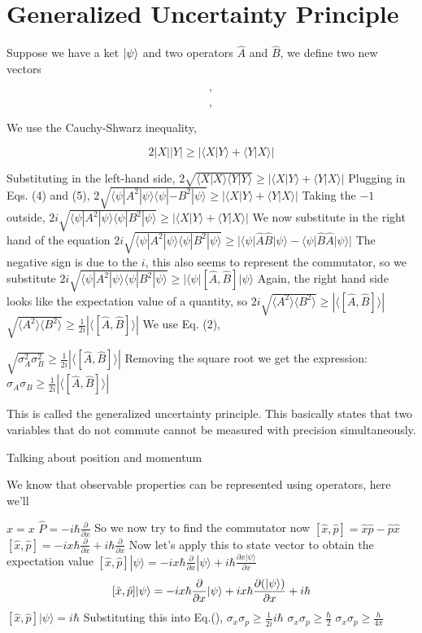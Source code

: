 \section{Generalized Uncertainty Principle}
Suppose we have a ket $\ket{\psi}$ and two operators $\hat{A}$ and $\hat{B}$, we define two new vectors

$$,$$

$$,$$

We use the Cauchy-Shwarz inequality,

$$ 2|X||Y| \geq |\langle X|Y \rangle + \langle Y|X \rangle |$$

Substituting in the left-hand side,
$2\sqrt{\langle X|X\rangle\langle Y|Y\rangle} \geq |\langle X| Y  \rangle+ \langle Y | X \rangle|$
Plugging in Eqs. (4) and (5),
$2\sqrt{\langle \psi |A^{2} |\psi \rangle \langle \psi | -B^{2}| \psi \rangle} \geq |\langle X | Y \rangle + \langle Y | X \rangle |$
Taking the $-1$ outside,
$2i\sqrt{\langle \psi |A^{2} |\psi \rangle \langle \psi | B^{2}| \psi \rangle} \geq |\langle X | Y \rangle + \langle Y | X \rangle|$
We now substitute in the right hand of the equation
$2i\sqrt{\langle \psi |A^{2} |\psi \rangle \langle \psi | B^{2}| \psi \rangle} \geq | \langle {\psi} |\hat{A}\hat{B}| {\psi} \rangle - \langle {\psi} |\hat{B}\hat{A}| {\psi} \rangle|$
The negative sign is due to the $i$, this also seems to represent the commutator, so we substitute
$2i\sqrt{\langle \psi |A^{2} |\psi \rangle \langle \psi | B^{2}| \psi \rangle }\geq |\langle\psi |[\hat{A},\hat{B}]|\psi\rangle$
Again, the right hand side looks like the expectation value of a quantity, so
$2i\sqrt{\langle A^{2} \rangle \langle B^{2} \rangle} \geq |\langle [\hat{A},\hat{B}] \rangle |$
$\sqrt{\langle A^{2} \rangle \langle B^{2} \rangle} \geq \frac{1}{2i} |\langle [\hat{A},\hat{B}] \rangle |$
We use Eq. (2),

$\sqrt{\sigma_{A}^{2}\sigma_{B}^{2}} \geq \frac{1}{2i} |\langle [\hat{A},\hat{B}] \rangle|$
Removing the square root we get the expression:
$\sigma_{A}\sigma_{B} \geq \frac{1}{2i} |\langle[\hat{A}, \hat{B}]\rangle|$

This is called the generalized uncertainty principle. This basically states that two variables that do not commute cannot be measured with precision simultaneously.

Talking about position and momentum

We know that observable properties can be represented using operators, here we'll 

$\hat{x} = x$
$\hat{P} = -i\hbar \frac{\partial}{\partial x}$
So we now try to find the commutator now
$[\hat{x}, \hat{p}] = \hat{x}\hat{p} - \hat{p}\hat{x}$
$[\hat{x}, \hat{p}] = -ix\hbar \frac{\partial}{\partial x} + i\hbar \frac{\partial}{\partial x}$
Now let's apply this to state vector to obtain the expectation value
$[\hat{x}, \hat{p}] |\psi\rangle = -ix\hbar \frac{\partial}{\partial x} |\psi\rangle + i\hbar \frac{\partial x|\psi\rangle}{\partial x}$
$$[\hat{x}, \hat{p}] |\psi\rangle = -ix\hbar \frac{\partial}{\partial x} |\psi\rangle + ix\hbar \pdv{(|\psi\rangle)}{x} + i\hbar$$
$[\hat{x}, \hat{p}] |\psi\rangle = i\hbar$
Substituting this into Eq.(),
$\sigma_{x}\sigma_{p} \geq \frac{1}{2i} i\hbar$
$\sigma_{x}\sigma_{p} \geq \frac{\hbar}{2}$ 
$\sigma_{x}\sigma_{p} \geq \frac{h}{4 \pi}$
